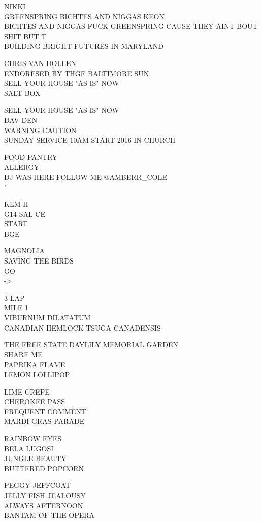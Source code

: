 \documentclass[10pt,letterpaper]{article}
\begin{document}
NIKKI\\
GREENSPRING BICHTES AND NIGGAS KEON\\
BICHTES AND NIGGAS FUCK GREENSPRING CAUSE THEY AINT BOUT SHIT BUT T\\
BUILDING BRIGHT FUTURES IN MARYLAND

CHRIS VAN HOLLEN\\
ENDORESED BY THGE BALTIMORE SUN\\
SELL YOUR HOUSE "AS IS" NOW\\
SALT BOX

SELL YOUR HOUSE "AS IS" NOW\\
DAV DEN\\
WARNING CAUTION\\
SUNDAY SERVICE 10AM START 2016 IN CHURCH

FOOD PANTRY\\
ALLERGY\\
DJ WAS HERE FOLLOW ME @AMBERR\_COLE\\
'

KLM H\\
G14 SAL CE\\
START\\
BGE

MAGNOLIA\\
SAVING THE BIRDS\\
GO\\
{-}>

3 LAP\\
MILE 1\\
VIBURNUM DILATATUM\\
CANADIAN HEMLOCK TSUGA CANADENSIS

THE FREE STATE DAYLILY MEMORIAL GARDEN\\
SHARE ME\\
PAPRIKA FLAME\\
LEMON LOLLIPOP

LIME CREPE\\
CHEROKEE PASS\\
FREQUENT COMMENT\\
MARDI GRAS PARADE

RAINBOW EYES\\
BELA LUGOSI\\
JUNGLE BEAUTY\\
BUTTERED POPCORN

PEGGY JEFFCOAT\\
JELLY FISH JEALOUSY\\
ALWAYS AFTERNOON\\
BANTAM OF THE OPERA
\end{document}
